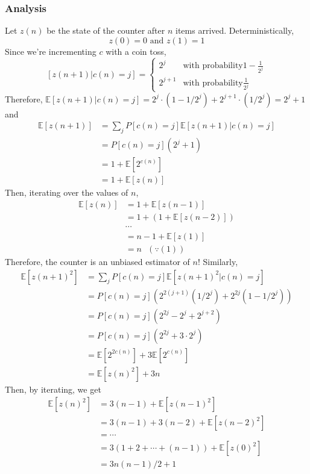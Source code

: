 \documentclass[12pt]{article}
\begin{document}
\subsubsection{Analysis}
Let $z(n)$ be the state of the counter after $n$ items arrived. Deterministically,
\begin{equation}
z(0)=0 \text{  and  } z(1)=1
\end{equation}
Since we're incrementing $c$ with a coin toss,
$$[z(n+1)|c(n)=j]=\begin{cases}
2^j &\mbox{with probability} 1-\frac{1}{2^j} \\
2^{j+1} &\mbox{with probability} \frac{1}{2^j}
\end{cases}$$
Therefore, $\mathbb{E}[z(n+1)|c(n)=j]=2^j\cdot(1-1/2^j)+2^{j+1}\cdot(1/2^j)=2^j+1$ and 
\begin{equation}
\begin{split}
\mathbb{E}[z(n+1)]&=\sum_jP[c(n)=j]\mathbb{E}[z(n+1)|c(n)=j]\\
&=P[c(n)=j](2^j+1)\\
&=1+\mathbb{E}[2^{c(n)}]\\
&=1+\mathbb{E}[z(n)]
\end{split}
\end{equation}
Then, iterating over the values of $n$,
\begin{equation}
\begin{split}
\mathbb{E}[z(n)]&=1+\mathbb{E}[z(n-1)]\\
&=1+(1+\mathbb{E}[z(n-2)])\\
&\cdots\\
&=n-1+\mathbb{E}[z(1)]\\
&=n \text{      }(\because (1))
\end{split}
\end{equation}
Therefore, the counter is an unbiased estimator of $n$! Similarly, 
\begin{equation}
\begin{split}
\mathbb{E}[z(n+1)^2]&=\sum_jP[c(n)=j]\mathbb{E}[z(n+1)^2|c(n)=j]\\
&=P[c(n)=j](2^{2(j+1)}(1/2^j)+2^{2j}(1-1/2^j))\\
&=P[c(n)=j](2^{2j}-2^j+2^{j+2})\\
&=P[c(n)=j](2^{2j}+3\cdot2^j)\\
&=\mathbb{E}[2^{2c(n)}]+3\mathbb{E}[2^{c(n)}]\\
&=\mathbb{E}[z(n)^2]+3n
\end{split}
\end{equation}
Then, by iterating, we get
\begin{equation}
\begin{split}
\mathbb{E}[z(n)^2]&=3(n-1)+\mathbb{E}[z(n-1)^2]\\
&=3(n-1)+3(n-2)+\mathbb{E}[z(n-2)^2]\\
&=\cdots\\
&=3(1+2+\cdots+(n-1))+\mathbb{E}[z(0)^2]\\
&=3n(n-1)/2+1
\end{split}
\end{equation}
\end{document}
